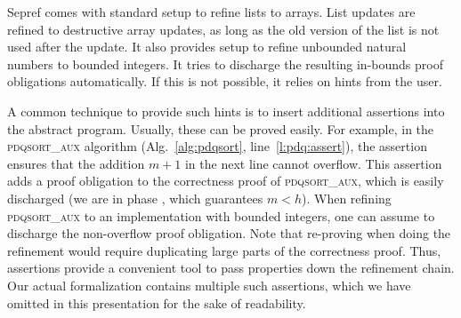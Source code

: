 \documentclass[runningheads]{llncs}
\begin{document}
  Sepref comes with standard setup to refine lists to arrays. List updates are refined to destructive array updates,
  as long as the old version of the list is not used after the update.
  It also provides setup to refine unbounded natural numbers to bounded integers.
  It tries to discharge the resulting in-bounds proof obligations automatically.
  If this is not possible, it relies on hints from the user.

  A common technique to provide such hints is to insert additional assertions into the abstract program.
  Usually, these can be proved easily. For example, in the \textsc{pdqsort\_aux} algorithm (Alg.~\ref{alg:pdqsort}, line~\ref{l:pdq:assert}), the
  assertion  ensures that the addition \is$m+1$ in the next line cannot overflow.
  This assertion adds a proof obligation to the correctness proof of \textsc{pdqsort\_aux},
  which is easily discharged (we are in phase , which guarantees \is$m<h$).
  When refining \textsc{pdqsort\_aux} to an implementation with bounded
  integers, one can assume  to discharge the non-overflow proof obligation.
  Note that re-proving  when doing the refinement would require duplicating large parts of the correctness proof.
  Thus, assertions provide a convenient tool to pass properties down the refinement chain.
  Our actual formalization contains multiple such assertions, which we have omitted in this presentation for the sake of readability.

\end{document}

